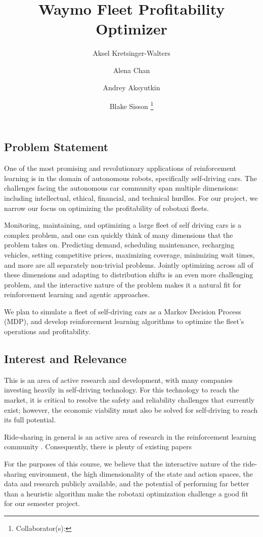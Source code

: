 \documentclass[12pt]{article}
\title{Waymo Fleet Profitability Optimizer}
\author{
		Aksel Kretsinger-Walters \and
		Alena Chan \and
		Andrey Aksyutkin \and
		Blake Sisson \footnote{Collaborator(s): \collaborators}
}
\date{}
\begin{document}
\maketitle

\subsection*{Problem Statement}
One of the most promising and revolutionary applications of reinforcement learning is in
the domain of autonomous robots, specifically self-driving cars. The challenges facing the
autonomous car community span multiple dimensions: including intellectual, ethical, financial, 
and technical hurdles. For our project, we narrow our focus on optimizing the profitability
of robotaxi fleets.

Monitoring, maintaining, and optimizing a large fleet of self driving cars is a complex
problem, and one can quickly think of many dimensions that the problem takes on.
Predicting demand, scheduling maintenance, recharging vehicles, setting competitive
prices, maximizing coverage, minimizing wait times, and more are all separately non-trivial
problems. Jointly optimizing across all of these dimensions and adapting to distribution shifts
is an even more challenging problem, and the interactive nature of the problem makes it a natural
fit for reinforcement learning and agentic approaches.

We plan to simulate a fleet of self-driving cars as a Markov Decision Process (MDP), and
develop reinforcement learning algorithms to optimize the fleet's operations and profitability.

\subsection*{Interest and Relevance}
This is an area of active research and development, with many companies investing heavily in
self-driving technology. For this technology to reach the market, it is critical to resolve the
safety and reliability challenges that currently exist; however, the economic viability must 
also be solved for self-driving to reach its full potential.

Ride-sharing in general is an active area of research in the reinforcement learning community \cite{ridesharing_survey}.
Consequently, there is plenty of existing papers 

For the purposes of this course, we believe that the interactive nature of the ride-sharing environment,
the high dimensionality of the state and action spaces, the data and research publicly
available, and the potential of performing far better than a heuristic algorithm make the
robotaxi optimization challenge a good fit for our semester project.
\end{document}
